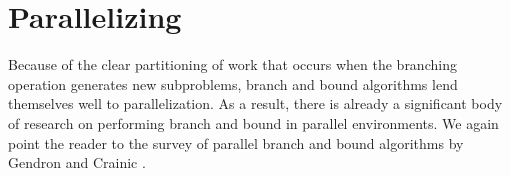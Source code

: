%
%

\section{Parallelizing \BB}
\label{parallelizing}

Because of the clear partitioning of work that occurs when the
branching operation generates new subproblems, branch and bound
algorithms lend themselves well to parallelization. As a result, there
is already a significant body of research on performing branch and
bound in parallel environments. We again point the reader to the
survey of parallel branch and bound algorithms by Gendron and Crainic
\cite{A:gendron-crainic}.

